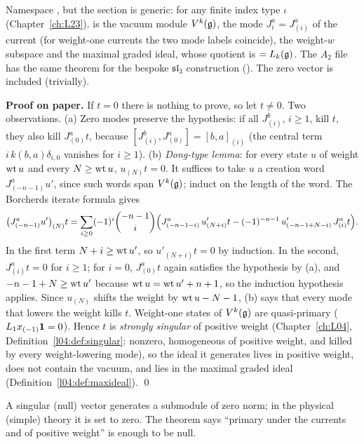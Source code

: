 \begin{dictionary}
Namespace , but the section is generic:  for any finite
index type $\iota$ (Chapter~\ref{ch:L23}).  is the vacuum module $V^k(\mathfrak g)$,
 the mode $J^a_i=J^a_{(i)}$ of the current (for weight-one currents the two mode labels
coincide),  the weight-$w$ subspace and  the maximal graded
ideal, whose quotient is  $=L_k(\mathfrak g)$. The $A_2$ file
 has the same theorem for the bespoke
$\mathfrak{sl}_3$ construction (). The zero vector is included (trivially).
\end{dictionary}

\textbf{Proof on paper.} If $t=0$ there is nothing to prove, so let $t\neq0$. Two observations.
(a) Zero modes preserve the hypothesis: if all $J^b_{(i)}$, $i\ge1$, kill $t$, they also kill $J^a_{(0)}t$, because
$[J^b_{(i)},J^a_{(0)}]=[b,a]_{(i)}$ (the central term $i\,k(b,a)\delta_{i,0}$ vanishes for $i\ge1$).
(b) \emph{Dong-type lemma}: for every state $u$ of weight $\operatorname{wt} u$ and every $N\ge\operatorname{wt} u$, $u_{(N)}t=0$. It suffices to take
$u$ a creation word $J^a_{(-n-1)}u'$, since such words span $V^k(\mathfrak g)$; induct on the length of the word. The
Borcherds iterate formula gives
\begin{equation*}
\bigl(J^a_{(-n-1)}u'\bigr)_{(N)}t=\sum_{i\ge0}(-1)^i\binom{-n-1}{i}\Bigl(J^a_{(-n-1-i)}\,u'_{(N+i)}t-(-1)^{-n-1}\,u'_{(-n-1+N-i)}\,J^a_{(i)}t\Bigr).
\end{equation*}
In the first term $N+i\ge\operatorname{wt} u'$, so $u'_{(N+i)}t=0$ by induction. In the second, $J^a_{(i)}t=0$ for $i\ge1$; for $i=0$,
$J^a_{(0)}t$ again satisfies the hypothesis by (a), and $-n-1+N\ge\operatorname{wt} u'$ because $\operatorname{wt} u=\operatorname{wt} u'+n+1$, so the induction
hypothesis applies. Since $u_{(N)}$ shifts the weight by $\operatorname{wt} u-N-1$, (b) says that every mode that lowers the weight
kills $t$. Weight-one states of $V^k(\mathfrak g)$ are quasi-primary ($L_1x_{(-1)}\mathbf 1=0$). Hence $t$ is
\emph{strongly singular} of positive weight (Chapter~\ref{ch:L04}, Definition~\ref{l04:def:singular}: nonzero,
homogeneous of positive weight, and killed by every weight-lowering mode), so the ideal it generates lives in positive
weight, does not contain the vacuum, and lies in the maximal graded ideal (Definition~\ref{l04:def:maxideal}). \qed

\begin{physics}
A singular (null) vector generates a submodule of zero norm; in the physical (simple) theory it is set to
zero. The theorem says ``primary under the currents and of positive weight'' is enough to be null.
\end{physics}

